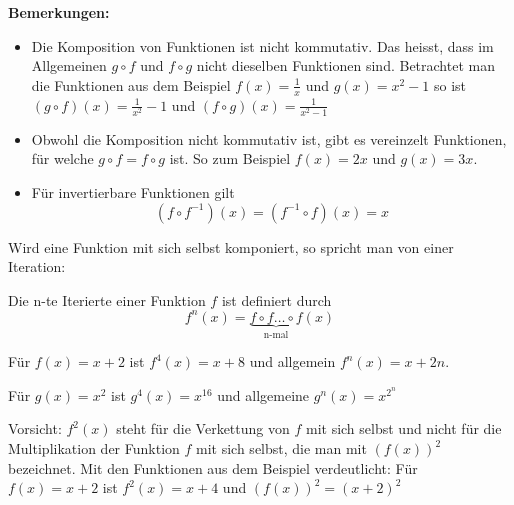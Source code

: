 \textbf{Bemerkungen:}
\begin{itemize}
    \item 	Die Komposition von Funktionen ist nicht kommutativ. Das heisst, dass im Allgemeinen $g\circ f$ und $f\circ g$ nicht dieselben Funktionen sind. Betrachtet man die Funktionen aus dem Beispiel $f(x)=\frac{1}{x}$ und $g(x)=x^2-1$ so ist $(g\circ f)(x)=\frac{1}{x^2} -1$ und $(f\circ g)(x)=\frac{1}{x^2-1}$
    \item Obwohl die Komposition nicht kommutativ ist, gibt es vereinzelt Funktionen, für welche $g\circ f=f\circ g$ ist. So zum Beispiel $f(x)=2x$ und $g(x)=3x$.
    \item Für invertierbare Funktionen gilt
          \[(f\circ f^{-1})(x)=(f^{-1}\circ f)(x)=x\]
\end{itemize}
\newpage
Wird eine Funktion mit sich selbst komponiert, so spricht man von einer Iteration:
\begin{deff}[Iteration]{}
    Die n-te Iterierte einer Funktion $f$ ist definiert durch
    \[f^n (x)=\underbrace{f\circ f \dots \circ f}_{\text{n-mal}}(x)\]
\end{deff}
\begin{example}
    Für $f(x)=x+2$ ist $f^4 (x)=x+8$ und allgemein $f^n (x)=x+2n$.

    Für $g(x)=x^2$ ist $g^4 (x)=x^{16}$ und allgemeine $g^n (x)=x^{2^n}$
\end{example}

\begin{fazit}[]{}
    Vorsicht: $f^2 (x)$  steht für die Verkettung von $f$ mit sich selbst und nicht für die Multiplikation der Funktion $f$ mit sich selbst, die man mit $(f(x))^2$ bezeichnet. Mit den Funktionen aus dem Beispiel verdeutlicht: Für $f(x)=x+2$ ist $f^2 (x)=x+4$ und $(f(x))^2=(x+2)^2$
\end{fazit}
\newpage
